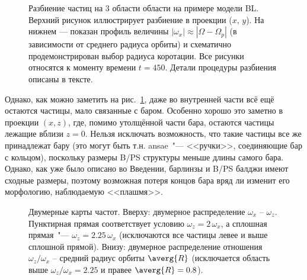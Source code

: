 \documentclass[tikz]{trlnotes}
\begin{document}
\begin{figure}[htpb]
  \centering
  \caption{Разбиение частиц на 3 области области на примере модели BL.
    Верхний рисунок иллюстрирует разбиение в проекции ($x$, $y$).
    На нижнем --- показан профиль величины $|ω_x| \approx |Ω - Ω_p|$ (в зависимости от среднего радиуса орбиты) и схематично продемонстрирован выбор радиуса коротации. Все рисунки относятся к моменту времени $t=450$.
Детали процедуры разбиения описаны в тексте.}%
  \label{fig:disksplit}
\end{figure}

Однако, как можно заметить на рис.~\ref{fig:disksplit}, даже во внутренней части всё ещё остаются частицы, мало
связанные с баром. Особенно хорошо это заметно в проекции $(x, z)$, где, помимо утолщённой части бара, остаются
частицы лежащие вблизи $z=0$. Нельзя исключать возможность, что такие частицы все же принадлежат бару (это могут быть т.н.
ansae~"--- <<ручки>>, соединяющие бар с кольцом), поскольку размеры B/PS структуры меньше длины самого бара. Однако, как
уже было описано во Введении, барлинзы и B/PS балджи имеют сходные размеры, поэтому возможная потеря концов бара
вряд ли изменит его морфологию, наблюдаемую <<плашмя>>. 

\begin{figure}[htpb]
  \centering
  \caption{Двумерные карты частот. Вверху: двумерное распределение
    $ω_x$ -- $ω_z$. Пунктирная прямая соответствует условию $ω_z = 2\,ω_x$, а сплошная прямая~"--- $ω_z = 2.25\, ω_x$
    (исключаются все частицы левее и выше сплошной прямой). Внизу: двумерное распределение отношения $ω_z/ω_x$ -- средний радиус орбиты $\averg{R}$ 
  (исключается область выше $ω_z/ω_x = 2.25$ и правее $\averg{R} = 0.8$).}
  \label{fig:innerrefine}
\end{figure}
\end{document}
